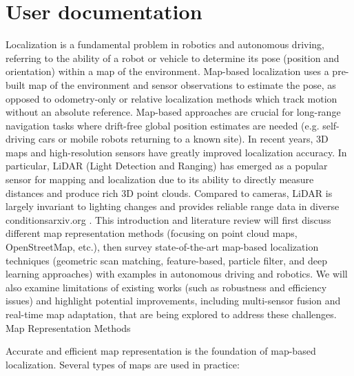 \chapter{User documentation}
\label{ch:user}

Localization is a fundamental problem in robotics and autonomous driving, referring to the ability of a robot or vehicle to determine its pose (position and orientation) within a map of the environment. Map-based localization uses a pre-built map of the environment and sensor observations to estimate the pose, as opposed to odometry-only or relative localization methods which track motion without an absolute reference. Map-based approaches are crucial for long-range navigation tasks where drift-free global position estimates are needed (e.g. self-driving cars or mobile robots returning to a known site). In recent years, 3D maps and high-resolution sensors have greatly improved localization accuracy. In particular, LiDAR (Light Detection and Ranging) has emerged as a popular sensor for mapping and localization due to its ability to directly measure distances and produce rich 3D point clouds. Compared to cameras, LiDAR is largely invariant to lighting changes and provides reliable range data in diverse conditions​
arxiv.org
. This introduction and literature review will first discuss different map representation methods (focusing on point cloud maps, OpenStreetMap, etc.), then survey state-of-the-art map-based localization techniques (geometric scan matching, feature-based, particle filter, and deep learning approaches) with examples in autonomous driving and robotics. We will also examine limitations of existing works (such as robustness and efficiency issues) and highlight potential improvements, including multi-sensor fusion and real-time map adaptation, that are being explored to address these challenges.
Map Representation Methods

Accurate and efficient map representation is the foundation of map-based localization. Several types of maps are used in practice:

